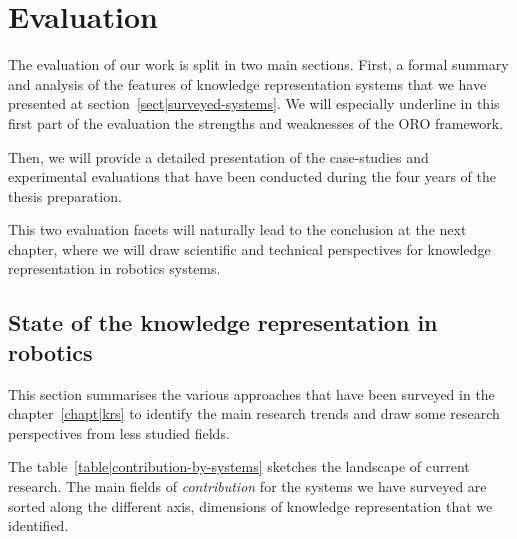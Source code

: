 \chapter{Evaluation}
\label{chapt|evaluation}

The evaluation of our work is split in two main sections. First, a formal
summary and analysis of the features of knowledge representation systems that
we have presented at section~\ref{sect|surveyed-systems}. We will especially
underline in this first part of the evaluation the strengths and weaknesses of
the ORO framework.

Then, we will provide a detailed presentation of the case-studies and
experimental evaluations that have been conducted during the four years of the
thesis preparation.

This two evaluation facets will naturally lead to the conclusion at the next
chapter, where we will draw scientific and technical perspectives for knowledge
representation in robotics systems.


\section{State of the knowledge representation in robotics}
\label{sect|evaluation-oroserver}

This section summarises the various approaches that have been surveyed in the
chapter~\ref{chapt|krs} to identify the main research trends and draw some
research perspectives from less studied fields.

The table~\ref{table|contribution-by-systems} sketches the landscape of current
research. The main fields of \emph{contribution} for the systems we have
surveyed are sorted along the different axis, dimensions of knowledge
representation that we identified.

